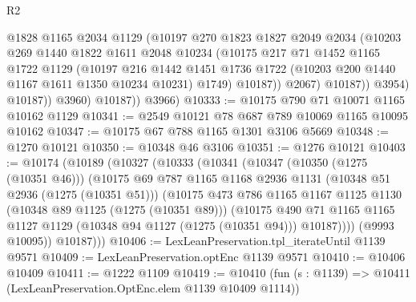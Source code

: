\begin{lexlean}{R2}
\begin{coremodule}
                      @1828
                      @1165
                      @2034
                      @1129
                      (@10197
                        @270
                        @1823
                        @1827
                        @2049
                        @2034
                        (@10203
                          @269
                          @1440
                          @1822
                          @1611
                          @2048
                          @10234
                          (@10175
                            @217
                            @71
                            @1452
                            @1165
                            @1722
                            @1129
                            (@10197
                              @216
                              @1442
                              @1451
                              @1736
                              @1722
                              (@10203 @200 @1440 @1167 @1611 @1350 @10234 @10231)
                              @1749)
                            @10187))
                        @2067)
                      @10187))
                  @3954)
                @10187))
            @3960)
          @10187))
      @3966)
@10333 := @10175 @790 @71 @10071 @1165 @10162 @1129
@10341 := @2549 @10121 @78 @687 @789 @10069 @1165 @10095 @10162
@10347 := @10175 @67 @788 @1165 @1301 @3106 @5669
@10348 := @1270 @10121
@10350 := @10348 @46 @3106
@10351 := @1276 @10121
@10403 := @10174
    (@10189
      (@10327
        (@10333
          (@10341
            (@10347
              (@10350 (@1275 (@10351 @46)))
              (@10175
                @69
                @787
                @1165
                @1168
                @2936
                @1131
                (@10348 @51 @2936 (@1275 (@10351 @51)))
                (@10175
                  @473
                  @786
                  @1165
                  @1167
                  @1125
                  @1130
                  (@10348 @89 @1125 (@1275 (@10351 @89)))
                  (@10175
                    @490
                    @71
                    @1165
                    @1165
                    @1127
                    @1129
                    (@10348 @94 @1127 (@1275 (@10351 @94)))
                    @10187))))
            (@9993 @10095))
          @10187)))
@10406 := LexLeanPreservation.tpl_iterateUntil @1139 @9571
@10409 := LexLeanPreservation.optEnc @1139 @9571
@10410 := @10406 @10409
@10411 := @1222 @1109
@10419 := @10410
    (fun (s : @1139) => @10411 (LexLeanPreservation.OptEnc.elem @1139 @10409 @1114))

\end{coremodule}
\end{lexlean}
